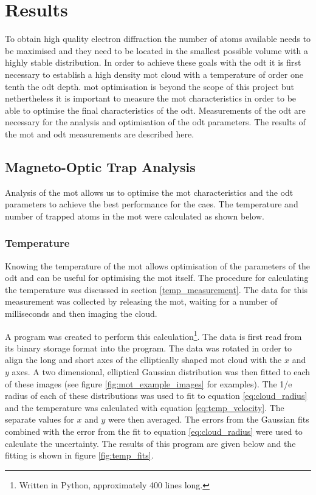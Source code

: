 \chapter{Results}

To obtain high quality electron diffraction the number of atoms available needs to be maximised and they need to be located in the smallest possible volume with a highly stable distribution. In order to achieve these goals with the \gls{odt} it is first necessary to establish a high density \gls{mot} cloud with a temperature of order one tenth the \gls{odt} depth. \Gls{mot} optimisation is beyond the scope of this project but nethertheless it is important to measure the \gls{mot} characteristics in order to be able to optimise the final characteristics of the \gls{odt}. Measurements of the \gls{odt} are necessary for the analysis and optimisation of the \gls{odt} parameters. The results of the \gls{mot} and \gls{odt} measurements are described here.

\section{Magneto-Optic Trap Analysis}
Analysis of the \gls{mot} allows us to optimise the \gls{mot} characteristics and the \gls{odt} parameters to achieve the best performance for the \gls{caes}. The temperature and number of trapped atoms in the \gls{mot} were calculated as shown below.

\subsection{Temperature}
Knowing the temperature of the \gls{mot} allows optimisation of the parameters of the \gls{odt} and can be useful for optimising the \gls{mot} itself. The procedure for calculating the temperature was discussed in section \ref{temp_measurement}. The data for this measurement was collected by releasing the \gls{mot}, waiting for a number of milliseconds and then imaging the cloud.

A program was created to perform this calculation\footnote{Written in Python, approximately 400 lines long.}. The data is first read from its binary storage format into the program. The data was rotated in order to align the long and short axes of the elliptically shaped \gls{mot} cloud with the $x$ and $y$ axes. A two dimensional, elliptical Gaussian distribution was then fitted to each of these images (see figure \ref{fig:mot_example_images} for examples). The 1/e radius of each of these distributions was used to fit to equation \ref{eq:cloud_radius} and the temperature was calculated with equation \ref{eq:temp_velocity}. The separate values for $x$ and $y$ were then averaged. The errors from the Gaussian fits combined with the error from the fit to equation \ref{eq:cloud_radius} were used to calculate the uncertainty. The results of this program are given below and the fitting is shown in figure \ref{fig:temp_fits}.

